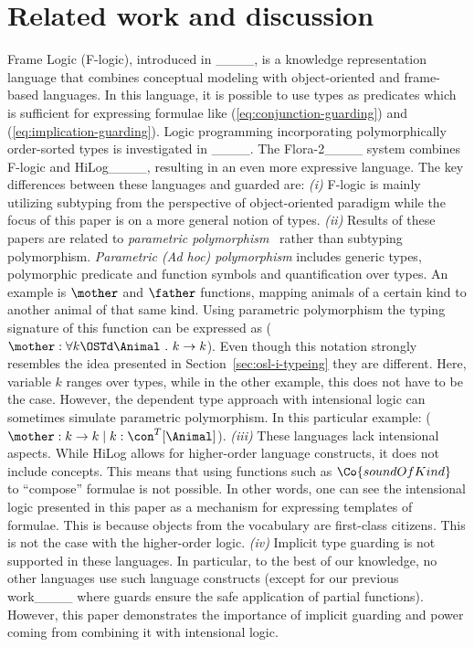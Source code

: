 \section{Related work and discussion}
\label{sec:related-work}

Frame Logic (F-logic), introduced in ____, is a knowledge representation language that combines conceptual modeling with object-oriented and frame-based languages. 
In this language, it is possible to use types as predicates which is sufficient for expressing formulae like (\ref{eq:conjunction-guarding}) and (\ref{eq:implication-guarding}).
Logic programming incorporating polymorphically order-sorted types is investigated in ____. 
The Flora-2____ system combines F-logic and HiLog____, resulting in an even more expressive language.
The key differences between these languages and guarded \OSL are:
    \textit{(i)} F-logic is mainly utilizing subtyping from the perspective of object-oriented paradigm while the focus of this paper is on a more general notion of types.
    \textit{(ii)} Results of these papers are related to \emph{parametric polymorphism}~\cite[Chapter 23]{pierce2002types} rather than subtyping polymorphism.
    \emph{Parametric (Ad hoc) polymorphism} includes generic types,  polymorphic  predicate and function symbols %
    and quantification over types.
    An example is $\mother$ and $\father$ functions, mapping animals of a certain kind to another animal of that same kind. Using parametric polymorphism the typing signature of this function can be expressed as ($\mother : \forall k \OSTd \Animal \ .\ k \rightarrow k$). Even though this notation strongly resembles the idea presented in Section~\ref{sec:osl-i-typeing} they are different. Here, variable $k$ ranges over types, while in the other example, this does not have to be the case. However, the dependent type approach with intensional logic can sometimes simulate parametric polymorphism. In this particular example: ($\mother : k \rightarrow k \mid k : \con^T[\Animal]$).
    \textit{(iii)} These languages lack intensional aspects. While HiLog allows for higher-order language constructs, it does not include concepts. This means that using functions such as $\Co{soundOfKind}$ to ``compose'' formulae is not possible. 
    In other words, one can see the intensional logic presented in this paper as a mechanism for expressing templates of formulae. This is because objects from the vocabulary are first-class citizens. This is not the case with the higher-order logic.
    \textit{(iv)} Implicit type guarding is not supported in these languages. 
    In particular, to the best of our knowledge, no other languages use such language constructs (except for our previous work____ where guards ensure the safe application of partial functions).
    However, this paper demonstrates the importance of implicit guarding and power coming from combining it with intensional logic.

